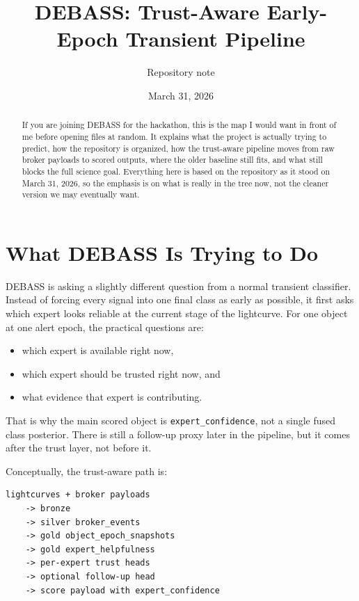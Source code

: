 \documentclass[11pt]{article}
\title{DEBASS: Trust-Aware Early-Epoch Transient Pipeline}
\author{Repository note}
\date{March 31, 2026}
\newcommand{\code}[1]{\texttt{#1}}
\begin{document}
\maketitle

\begin{abstract}
If you are joining DEBASS for the hackathon, this is the map I would want in front of me before opening files at random. It explains what the project is actually trying to predict, how the repository is organized, how the trust-aware pipeline moves from raw broker payloads to scored outputs, where the older baseline still fits, and what still blocks the full science goal. Everything here is based on the repository as it stood on March 31, 2026, so the emphasis is on what is really in the tree now, not the cleaner version we may eventually want.
\end{abstract}

\tableofcontents

\section{What DEBASS Is Trying to Do}

DEBASS is asking a slightly different question from a normal transient classifier. Instead of forcing every signal into one final class as early as possible, it first asks which expert looks reliable at the current stage of the lightcurve. For one object at one alert epoch, the practical questions are:

\begin{itemize}
\item which expert is available right now,
\item which expert should be trusted right now, and
\item what evidence that expert is contributing.
\end{itemize}

That is why the main scored object is \code{expert\_confidence}, not a single fused class posterior. There is still a follow-up proxy later in the pipeline, but it comes after the trust layer, not before it.

Conceptually, the trust-aware path is:

\begin{verbatim}
lightcurves + broker payloads
    -> bronze
    -> silver broker_events
    -> gold object_epoch_snapshots
    -> gold expert_helpfulness
    -> per-expert trust heads
    -> optional follow-up head
    -> score payload with expert_confidence
\end{verbatim}
\end{document}
